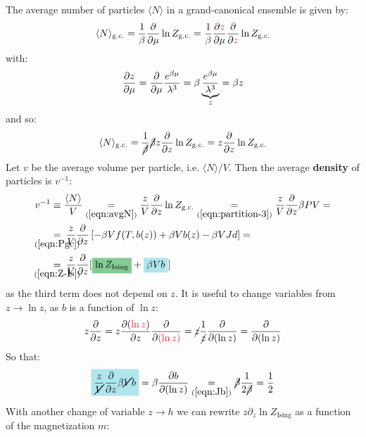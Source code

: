 \documentclass[../../main.tex]{subfiles}
\begin{document}
The average number of particles $\langle N \rangle$ in a grand-canonical ensemble is given by:
\begin{align} 
    \langle N \rangle_{\mathrm{g.c.}} = \frac{1}{\beta} \pdv{\mu} \ln Z_{\mathrm{g.c.}} = \frac{1}{\beta} \pdv{\textcolor{Red}{z}}{\mu} \pdv{\textcolor{Red}{z}} \ln Z_{\mathrm{g.c.}}
\end{align}
with:
\begin{align*}
    \pdv{z}{\mu} = \pdv{\mu} \frac{e^{\beta \mu}}{\lambda^3} = \beta \underbrace{\frac{e^{\beta \mu}}{\lambda^3}}_{z} = \beta z 
\end{align*}
and so:
\begin{align}\label{eqn:avgN}
    \langle N \rangle_{\mathrm{g.c.}} = \frac{1}{\cancel{\beta}} \cancel{\beta} z \pdv{z} \ln Z_{\mathrm{g.c.}} = z \pdv{z} \ln Z_{\mathrm{g.c.}}
\end{align}
Let $v$ be the average volume per particle, i.e. $\langle N \rangle/V$. Then the average \textbf{density} of particles is $v^{-1}$:
\begin{align}\nonumber
    v^{-1} &\equiv \frac{\langle N \rangle}{V} \underset{(\ref{eqn:avgN})}{=}  \frac{z}{V}  \pdv{z} \ln Z_{\mathrm{g.c.}} \underset{(\ref{eqn:partition-3})}{=} \frac{z}{V} \pdv{z} \beta P V =\\ \nonumber
    &\underset{\mathclap{(\ref{eqn:Pgc})}}{=}\>  \frac{z}{V} \pdv{z} \left[-\beta V f(T,b(z)) +\beta V b(z)  - \beta V J d\right] =\\
    &\underset{\mathclap{(\ref{eqn:Z-Is})}}{=} \> \frac{z}{V} \pdv{z} [\hlc{ForestGreen}{\ln Z_{\mathrm{Ising}}} + \hlc{SkyBlue}{\beta V b}] \label{eqn:v-1}
\end{align}
as the third term does not depend on $z$. It is useful to change variables from $z \to \ln z$, as $b$ is a function of $\ln z$:
\begin{align*}
    z\pdv{z} = z \pdv{(\textcolor{Red}{\ln z})}{z} \pdv{\textcolor{Red}{(\ln z)}} = \cancel{z} \frac{1}{\cancel{z}} \pdv{(\ln z)} = \pdv{(\ln z)} 
\end{align*}
So that:
\begin{align}\label{eqn:dv1}
    \hlc{SkyBlue}{\frac{z}{\cancel{V}} \pdv{z} \beta \cancel{V} b} = \beta  \pdv{b}{(\ln z)} \underset{(\ref{eqn:Jb})}{=}  \cancel{\beta } \frac{1}{2\cancel{ \beta }} = \frac{1}{2} 
\end{align}
With another change of variable $z \to h$ we can rewrite $z \partial_z \ln Z_{\mathrm{Ising}}$ as a function of the magnetization $m$:
\end{document}
